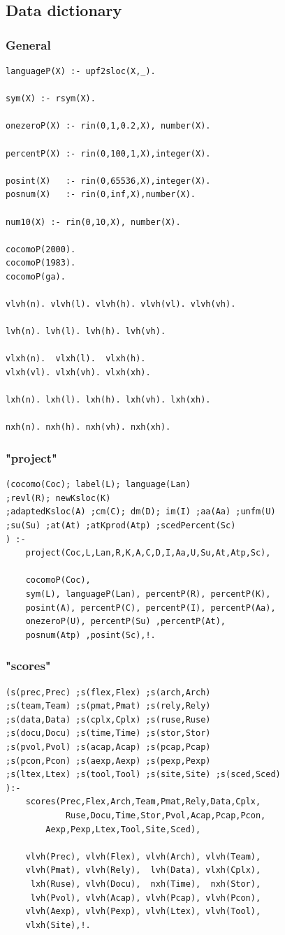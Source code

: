 \documentclass[twocolumn,global]{svjour}
\begin{document}
\subsection{ Data dictionary
}
\subsubsection{ General }\begin{Verbatim}
languageP(X) :- upf2sloc(X,_).

sym(X) :- rsym(X).

onezeroP(X) :- rin(0,1,0.2,X), number(X).

percentP(X) :- rin(0,100,1,X),integer(X).

posint(X)   :- rin(0,65536,X),integer(X).
posnum(X)   :- rin(0,inf,X),number(X).

num10(X) :- rin(0,10,X), number(X).

cocomoP(2000).
cocomoP(1983).
cocomoP(ga).

vlvh(n). vlvh(l). vlvh(h). vlvh(vl). vlvh(vh).

lvh(n). lvh(l). lvh(h). lvh(vh).

vlxh(n).  vlxh(l).  vlxh(h).
vlxh(vl). vlxh(vh). vlxh(xh).

lxh(n). lxh(l). lxh(h). lxh(vh). lxh(xh).

nxh(n). nxh(h). nxh(vh). nxh(xh).
\end{Verbatim}
\subsubsection{ "project"
}
\begin{Verbatim}
(cocomo(Coc); label(L); language(Lan)
;revl(R); newKsloc(K)
;adaptedKsloc(A) ;cm(C); dm(D); im(I) ;aa(Aa) ;unfm(U)
;su(Su) ;at(At) ;atKprod(Atp) ;scedPercent(Sc)
) :-
    project(Coc,L,Lan,R,K,A,C,D,I,Aa,U,Su,At,Atp,Sc),

    cocomoP(Coc),
    sym(L), languageP(Lan), percentP(R), percentP(K),
    posint(A), percentP(C), percentP(I), percentP(Aa),
    onezeroP(U), percentP(Su) ,percentP(At),
    posnum(Atp) ,posint(Sc),!.
\end{Verbatim}
\subsubsection{ "scores"
}
\begin{Verbatim}
(s(prec,Prec) ;s(flex,Flex) ;s(arch,Arch)
;s(team,Team) ;s(pmat,Pmat) ;s(rely,Rely)
;s(data,Data) ;s(cplx,Cplx) ;s(ruse,Ruse)
;s(docu,Docu) ;s(time,Time) ;s(stor,Stor)
;s(pvol,Pvol) ;s(acap,Acap) ;s(pcap,Pcap)
;s(pcon,Pcon) ;s(aexp,Aexp) ;s(pexp,Pexp)
;s(ltex,Ltex) ;s(tool,Tool) ;s(site,Site) ;s(sced,Sced)
):-
    scores(Prec,Flex,Arch,Team,Pmat,Rely,Data,Cplx,
            Ruse,Docu,Time,Stor,Pvol,Acap,Pcap,Pcon,
        Aexp,Pexp,Ltex,Tool,Site,Sced),

    vlvh(Prec), vlvh(Flex), vlvh(Arch), vlvh(Team),
    vlvh(Pmat), vlvh(Rely),  lvh(Data), vlxh(Cplx),
     lxh(Ruse), vlvh(Docu),  nxh(Time),  nxh(Stor),
     lvh(Pvol), vlvh(Acap), vlvh(Pcap), vlvh(Pcon),
    vlvh(Aexp), vlvh(Pexp), vlvh(Ltex), vlvh(Tool),
    vlxh(Site),!.
\end{Verbatim}
\end{document}
